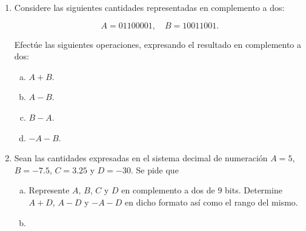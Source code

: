 \begin{frame}
    \begin{enumerate}
        \item

              Considere las siguientes cantidades representadas en
              complemento a dos:

              \begin{equation*}
                  A=01100001,\quad
                  B=10011001.
              \end{equation*}

              Efectúe las siguientes operaciones, expresando el
              resultado en complemento a dos:

              \begin{multicols}{4}
                  \begin{enumerate}[a)]
                      \item

                            $A+B$.

                      \item

                            $A-B$.

                      \item

                            $B-A$.

                      \item

                            $-A-B$.
                  \end{enumerate}
              \end{multicols}

        \item

              Sean las cantidades expresadas en el sistema decimal
              de numeración $A=5$, $B=-7.5$, $C=3.25$ y $D=-30$.
              Se pide que

              \begin{enumerate}[a)]
                  \item

                        Represente $A$, $B$, $C$ y $D$ en complemento
                        a dos de $9$ bits.
                        Determine $A+D$, $A-D$ y $-A-D$ en dicho
                        formato así como el rango del mismo.

                  \item\label{q:b}


\end{enumerate}
\end{enumerate}
\end{frame}
